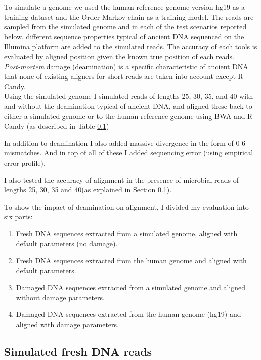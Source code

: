 \documentclass[11pt,a4paper]{report}
\begin{document}
To simulate a genome we used the human reference genome version hg19 as a training 
dataset and the  Order Markov chain as a training model. The reads are sampled 
from the simulated genome and in each of the test scenarios reported below, 
different sequence properties typical of ancient DNA sequenced on the Illumina 
platform are added to the simulated reads. The accuracy of each tools is evaluated 
by aligned position given the known true position of each reads.
\\
\emph{Post-mortem} damage (deamination) is a specific characteristic of ancient 
DNA that none of existing aligners for short reads are taken into account except 
R-Candy.\\

Using the simulated genome I simulated reads of lengths 25, 30, 35, and 40 with 
and without the deamination typical of ancient DNA, and aligned these back to either 
a simulated genome or to the human reference genome using BWA and R-Candy (as 
described in Table \ref{})

In addition to deamination I also added massive divergence in the form of 0-6 
mismatches. And in top of all of these I added sequencing error (using empirical 
error profile).  

I also tested the accuracy of alignment in the presence of microbial reads of 
lengths 25, 30, 35 and 40(as explained in Section \ref{}).

To show the impact of deamination on alignment, I divided my evaluation into six parts:
\begin{enumerate}

\item Fresh DNA sequences extracted from a simulated genome, aligned with default parameters (no damage).
\item Fresh DNA sequences extracted from the human genome and aligned with default parameters.
\item Damaged DNA sequences extracted from a simulated genome and aligned without damage parameters.
\item Damaged DNA sequences extracted from the human genome (hg19) and aligned with damage parameters.

\end{enumerate}

\subsection{Simulated fresh DNA reads }
 
\end{document}

